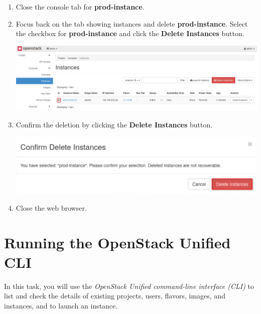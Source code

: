 \documentclass[letterpaper, 12pt]{article}
\begin{document}
\begin{enumerate}
    \item Close the console tab for \textbf{prod-instance}.

    \item Focus back on the tab showing instances and delete \textbf{prod-instance}. Select the checkbox for
    \textbf{prod-instance} and click the \textbf{Delete Instances} button.

    \begin{center}
        \includegraphics[width=\linewidth]{images/part1/step15.png}
    \end{center}

    \item Confirm the deletion by clicking the \textbf{Delete Instances} button.

    \begin{center}
        \includegraphics[width=\linewidth]{images/part1/step16.png}
    \end{center}

    \item Close the web browser.
\end{enumerate}

\section{Running the OpenStack Unified CLI}
In this task, you will use the \textit{OpenStack Unified command-line interface (CLI)} to list and check the details of
existing projects, users, flavors, images, and instances, and to launch an instance.
\end{document}
